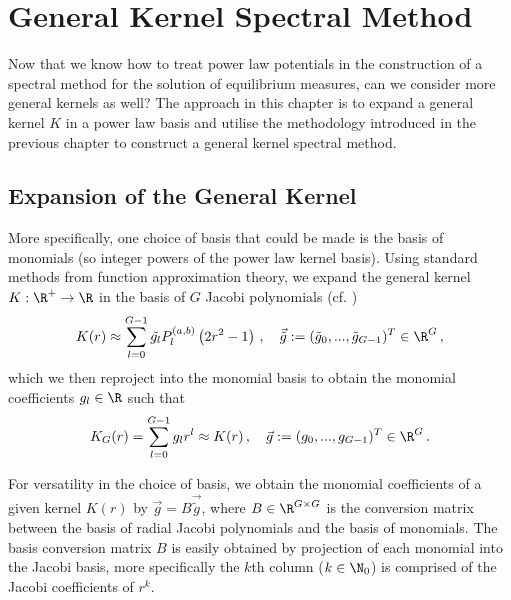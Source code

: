 \chapter{General Kernel Spectral Method}
\label{chap:general-kernel-spectral-method}

Now that we know how to treat power law potentials in the construction of a spectral method for the solution of equilibrium measures, can we consider more general kernels as well?
The approach in this chapter is to expand a general kernel $K$ in a power law basis and utilise the methodology introduced in the previous chapter to construct a general kernel spectral method.

\section{Expansion of the General Kernel}
More specifically, one choice of basis that could be made is the basis of monomials (so integer powers of the power law kernel basis).
Using standard methods from function approximation theory, we expand the general kernel $K: \R^+ \to \R$ in the basis of $G$ Jacobi polynomials (cf. )
$$K(r) \approx \sum_{l=0}^{G-1} \tilde{g_l} P_l^{(a, b)}\left(2 r^2 - 1\right)\,, \quad \vec{\tilde{g}} := (\tilde{g}_0, ..., \tilde{g}_{G-1})^T \in \R^G\,,$$
which we then reproject into the monomial basis to obtain the monomial coefficients $g_l \in \R$ such that
\begin{equation}
  K_G(r) = \sum_{l=0}^{G-1} g_l r^l \approx K(r)\,,\quad \vec{g} := ({g}_0, ..., {g}_{G-1})^T \in \R^G\,.
  \label{eq:monomial-expansion}
\end{equation}

For versatility in the choice of basis, we obtain the monomial coefficients of a given kernel $K(r)$ by $\vec{g} = B \vec{\tilde{g}}$, where $B \in \R^{G \times G}$ is the conversion matrix between the basis of radial Jacobi polynomials and the basis of monomials.
The basis conversion matrix $B$ is easily obtained by projection of each monomial into the Jacobi basis, more specifically the $k$th column ($k \in \N_0$) is comprised of the Jacobi coefficients of $r^{k}$.


